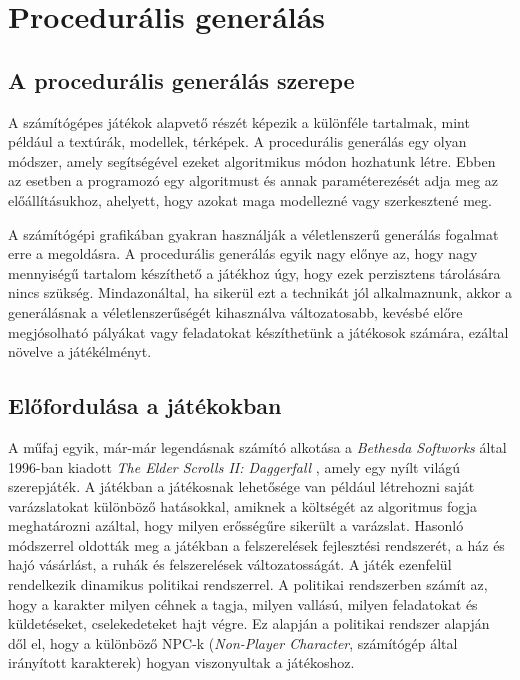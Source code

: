 \chapter{Procedurális generálás}

\section{A procedurális generálás szerepe}
\cite{ProceduralGeneration}

A számítógépes játékok alapvető részét képezik a különféle tartalmak, mint például a textúrák, modellek, térképek. A procedurális generálás egy olyan módszer, amely segítségével ezeket algoritmikus módon hozhatunk létre. Ebben az esetben a programozó egy algoritmust és annak paraméterezését adja meg az előállításukhoz, ahelyett, hogy azokat maga modellezné vagy szerkesztené meg.

A számítógépi grafikában gyakran használják a véletlenszerű generálás fogalmat erre a megoldásra. A procedurális generálás egyik nagy előnye az, hogy nagy mennyiségű tartalom készíthető a játékhoz úgy, hogy ezek perzisztens tárolására nincs szükség. Mindazonáltal, ha sikerül ezt a technikát jól alkalmaznunk, akkor a generálásnak a véletlenszerűségét kihasználva változatosabb, kevésbé előre megjósolható pályákat vagy feladatokat készíthetünk a játékosok számára, ezáltal növelve a játékélményt.  

\section{Előfordulása a játékokban}
\cite{Daggerfall}\cite{Civ1}\cite{Spore}\cite{ProceduralGeneration}\cite{CivV}

A műfaj egyik, már-már legendásnak számító alkotása a \textit{Bethesda Softworks} által 1996-ban kiadott \textit{The Elder Scrolls II: Daggerfall} \cite{Daggerfall}, amely egy nyílt világú szerepjáték. A játékban a játékosnak lehetősége van például létrehozni saját varázslatokat különböző hatásokkal, amiknek a költségét az algoritmus fogja meghatározni azáltal, hogy milyen erősségűre sikerült a varázslat. Hasonló módszerrel oldották meg a játékban a felszerelések fejlesztési rendszerét, a ház és hajó vásárlást, a ruhák és felszerelések változatosságát. A játék ezenfelül rendelkezik dinamikus politikai rendszerrel. A politikai rendszerben számít az, hogy a karakter milyen céhnek a tagja, milyen vallású, milyen feladatokat és küldetéseket, cselekedeteket hajt végre. Ez alapján a politikai rendszer alapján dől el, hogy a különböző NPC-k (\textit{Non-Player Character}, számítógép által irányított karakterek) hogyan viszonyultak a játékoshoz. 

